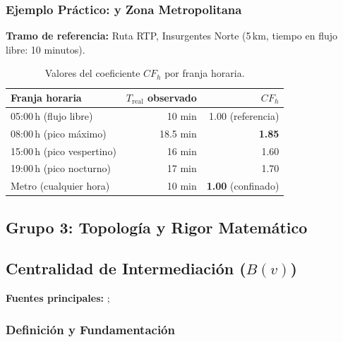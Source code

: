 \subsubsection{Ejemplo Práctico: \cdmx{} y Zona Metropolitana}

\textbf{Tramo de referencia:} Ruta RTP, Insurgentes Norte (5\,km, tiempo en flujo
libre: 10 minutos).

\begin{table}[H]
    \centering
    \caption{Valores del coeficiente $CF_h$ por franja horaria.}
    \label{tab:friccion-vial}
    \begin{tabularx}{\textwidth}{X r r}
        \toprule
        \textbf{Franja horaria} & \textbf{$T_{\text{real}}$ observado} &
        \textbf{$CF_h$} \\
        \midrule
        05:00\,h (flujo libre)          & 10 min   & 1.00 (referencia) \\
        08:00\,h (pico máximo)          & 18.5 min & \textbf{1.85} \\
        15:00\,h (pico vespertino)      & 16 min   & 1.60 \\
        19:00\,h (pico nocturno)        & 17 min   & 1.70 \\
        Metro (cualquier hora)          & 10 min   & \textbf{1.00} (confinado) \\
        \bottomrule
    \end{tabularx}
\end{table}

\subsection*{Grupo 3: Topología y Rigor Matemático}

\subsection{Centralidad de Intermediación \texorpdfstring{($B(v)$)}{(B(v))}}
\label{subsec:centralidad-intermediacion}

\textbf{Fuentes principales:} \textcite{lee2008}; \textcite{allauca2023}

\subsubsection{Definición y Fundamentación}

